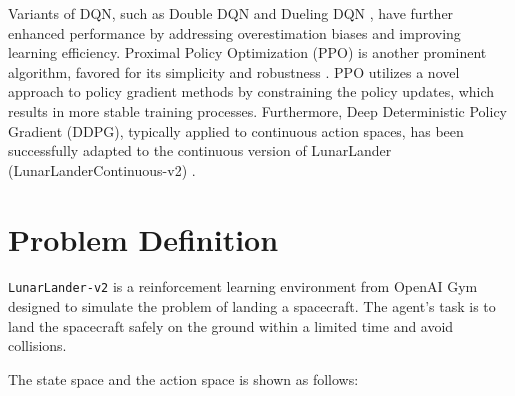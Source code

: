 \documentclass[conference]{IEEEtran}
\begin{document}
Variants of DQN, such as Double DQN \cite{van2016deep} and Dueling DQN \cite{wang2016dueling}, have further enhanced performance by addressing overestimation biases and improving learning efficiency. Proximal Policy Optimization (PPO) is another prominent algorithm, favored for its simplicity and robustness \cite{schulman2017proximal}. PPO utilizes a novel approach to policy gradient methods by constraining the policy updates, which results in more stable training processes. Furthermore, Deep Deterministic Policy Gradient (DDPG), typically applied to continuous action spaces, has been successfully adapted to the continuous version of LunarLander (LunarLanderContinuous-v2) \cite{lillicrap2015continuous}.%





\section{Problem Definition}

\texttt{LunarLander-v2} is a reinforcement learning environment from OpenAI Gym designed to simulate the problem of landing a spacecraft. The agent's task is to land the spacecraft safely on the ground within a limited time and avoid collisions.%


The state space and the action space is shown as follows:
\end{document}
